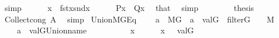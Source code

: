 \begin{isabellebody}
\ simp\isanewline
\ \ \ \ \isamarkupfalse%
\ {\isacartoucheopen}x\ {\isacharequal}{\kern0pt}\ {\isasymlangle}fst{\isacharparenleft}{\kern0pt}x{\isacharparenright}{\kern0pt}{\isacharcomma}{\kern0pt}snd{\isacharparenleft}{\kern0pt}x{\isacharparenright}{\kern0pt}{\isasymrangle}{\isacartoucheclose}\isanewline
\ \ \ \ \isamarkupfalse%
\ {\isachardoublequoteopen}{\isacharquery}{\kern0pt}P{\isacharparenleft}{\kern0pt}x{\isacharparenright}{\kern0pt}\ {\isasymlongleftrightarrow}\ {\isacharquery}{\kern0pt}Q{\isacharparenleft}{\kern0pt}x{\isacharparenright}{\kern0pt}{\isachardoublequoteclose}\ \isamarkupfalse%
\ that\ \isamarkupfalse%
\ simp\isanewline
\ \ \isamarkupfalse%
\isanewline
\ \ \isamarkupfalse%
\ \isamarkupfalse%
\ {\isacharquery}{\kern0pt}thesis\ \isamarkupfalse%
\ Collect{\isacharunderscore}{\kern0pt}cong\ A\ \isamarkupfalse%
\ simp\isanewline
{}\isamarkupfalse%
%
\endisatagproof
{\isafoldproof}%
%
\isadelimproof
\isanewline
%
\endisadelimproof
\isanewline
\isanewline
\isanewline
{}\isamarkupfalse%
\ Union{\isacharunderscore}{\kern0pt}MG{\isacharunderscore}{\kern0pt}Eq\ {\isacharcolon}{\kern0pt}\isanewline
\ \ \ {\isachardoublequoteopen}a\ {\isasymin}\ M{\isacharbrackleft}{\kern0pt}G{\isacharbrackright}{\kern0pt}{\isachardoublequoteclose}\ \ {\isachardoublequoteopen}a\ {\isacharequal}{\kern0pt}\ val{\isacharparenleft}{\kern0pt}G{\isacharcomma}{\kern0pt}{\isasymtau}{\isacharparenright}{\kern0pt}{\isachardoublequoteclose}\ \ {\isachardoublequoteopen}filter{\isacharparenleft}{\kern0pt}G{\isacharparenright}{\kern0pt}{\isachardoublequoteclose}\ \ {\isachardoublequoteopen}{\isasymtau}\ {\isasymin}\ M{\isachardoublequoteclose}\isanewline
\ \ \ {\isachardoublequoteopen}{\isasymUnion}\ a\ {\isacharequal}{\kern0pt}\ val{\isacharparenleft}{\kern0pt}G{\isacharcomma}{\kern0pt}Union{\isacharunderscore}{\kern0pt}name{\isacharparenleft}{\kern0pt}{\isasymtau}{\isacharparenright}{\kern0pt}{\isacharparenright}{\kern0pt}{\isachardoublequoteclose}\isanewline
%
\isadelimproof
%
\endisadelimproof
%
\isatagproof
{}\isamarkupfalse%
\ {\isacharminus}{\kern0pt}\isanewline
\ \ \isacommand{{\isacharbraceleft}{\kern0pt}}\isamarkupfalse%
\isanewline
\ \ \ \ \isamarkupfalse%
\ x\isanewline
\ \ \ \ \isamarkupfalse%
\ {\isachardoublequoteopen}x\ {\isasymin}\ {\isasymUnion}\ {\isacharparenleft}{\kern0pt}val{\isacharparenleft}{\kern0pt}G{\isacharcomma}{\kern0pt}{\isasymtau}{\isacharparenright}{\kern0pt}{\isacharparenright}{\kern0pt}{\isachardoublequoteclose}\isanewline

\end{isabellebody}
